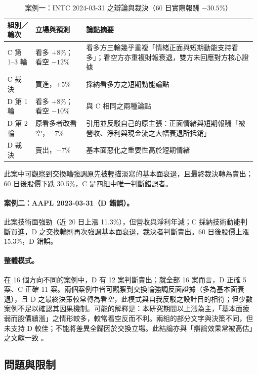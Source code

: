\documentclass[12pt,a4paper]{article}
\newcommand{\grp}[1]{\textsf{#1}}
\begin{document}
\begin{CJK}{UTF8}{bkai}
\begin{table}[H]
\centering\small
\caption{案例一：INTC 2024-03-31 之辯論與裁決（60 日實際報酬 $-30.5\%$）}
\label{tab:case}
\begin{tabularx}{\textwidth}{@{}l l Y@{}}
\toprule
組別／輪次 & 立場與預測 & 論點摘要 \\
\midrule
\grp{C} 第 1--3 輪 & 看多 $+8\%$；看空 $-12\%$ & 看多方三輪幾乎重複「情緒正面與短期動能支持看多」；看空方亦重複財報衰退，雙方未回應對方核心證據 \\
\grp{C} 裁決 & 買進，$+5\%$ & 採納看多方之短期動能論點 \\
\midrule
\grp{D} 第 1 輪 & 看多 $+8\%$；看空 $-10\%$ & 與 \grp{C} 相同之兩種論點 \\
\grp{D} 第 2 輪 & 原看多者改看空，$-7\%$ & 引用並反駁自己的原主張：正面情緒與短期報酬「被營收、淨利與現金流之大幅衰退所抵銷」 \\
\grp{D} 裁決 & 賣出，$-7\%$ & 基本面惡化之重要性高於短期情緒 \\
\bottomrule
\end{tabularx}
\end{table}

此案中可觀察到交換輪強調原先被輕描淡寫的基本面衰退，且最終裁決轉為賣出；60 日後股價下跌 30.5\%，\grp{C} 是四組中唯一判斷錯誤者。

\paragraph{案例二：AAPL 2023-03-31（\grp{D} 錯誤）。} 此案技術面強勁（近 20 日上漲 11.3\%），但營收與淨利年減；\grp{C} 採納技術動能判斷買進，\grp{D} 之交換輪則再次強調基本面衰退，裁決者判斷賣出。60 日後股價上漲 15.3\%，\grp{D} 錯誤。

\paragraph{整體模式。} 在 16 個方向不同的案例中，\grp{D} 有 12 案判斷賣出；就全部 16 案而言，D 正確 5 案、C 正確 11 案。兩個案例中皆可觀察到交換輪強調反面證據（多為基本面衰退），且 \grp{D} 之最終決策較常轉為看空，此模式與自我反駁之設計目的相符；但少數案例不足以確認其因果機制。可能的解釋是：本研究期間以上漲為主，「基本面疲弱而股價續漲」之情形較多，較常看空反而不利。兩組的部分文字與決策不同，但未支持 D 較佳；不能將差異全歸因於交換立場。此結論亦與「辯論效果常被高估」之文獻一致 \citep{smit2023mad,zhang2025stop}。

\subsection{問題與限制}


\end{CJK}
\end{document}
